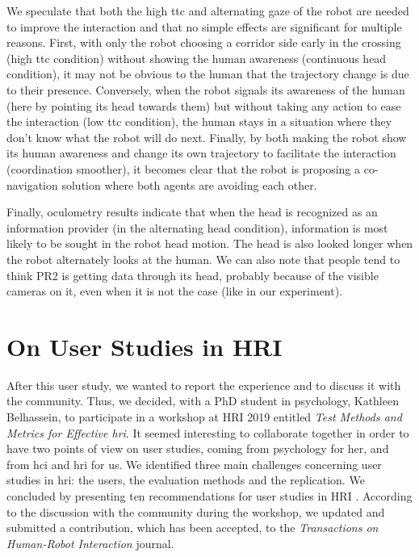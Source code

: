 \documentclass[a4paper,11pt,twoside]{StyleThese}
\begin{document}
We speculate that both the high \acrshort{ttc} and alternating gaze of the robot are needed to improve the interaction and that no simple effects are significant for multiple reasons. First, with only the robot choosing a corridor side early in the crossing (high \acrshort{ttc} condition) without showing the human awareness (continuous head condition), it may not be obvious to the human that the trajectory change is due to their presence. Conversely, when the robot signals its awareness of the human (here by pointing its head towards them) but without taking any action to ease the interaction (low \acrshort{ttc} condition), the human stays in a situation where they don't know what the robot will do next. Finally, by both making the robot show its human awareness and change its own trajectory to facilitate the interaction (coordination smoother), it becomes clear that the robot is proposing a co-navigation solution where both agents are avoiding each other.

Finally, oculometry results indicate that when the head is recognized as an information provider (in the alternating head condition), information is most likely to be sought in the robot head motion. The head is also looked longer when the robot alternately looks at the human. We can also note that people tend to think PR2 is getting data through its head, probably because of the visible cameras on it, even when it is not the case (like in our experiment).

\section{On User Studies in HRI}
After this user study, we wanted to report the experience and to discuss it with the community. Thus, we decided, with a PhD student in psychology, Kathleen Belhassein, to participate in a workshop at HRI 2019 entitled \textit{Test Methods and Metrics for Effective \acrshort{hri}}. It seemed interesting to collaborate together in order to have two points of view on user studies, coming from psychology for her, and from \acrshort{hci} and \acrshort{hri} for us. We identified three main challenges concerning user studies in \acrshort{hri}: the users, the evaluation methods and the replication. We concluded by presenting ten recommendations for user studies in HRI \cite{belhassein2019towards}. According to the discussion with the community during the workshop, we updated and submitted a contribution, which has been accepted, to the \textit{Transactions on Human-Robot Interaction} journal.
\end{document}
